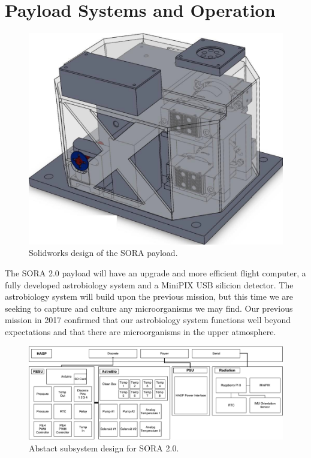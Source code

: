 \section{Payload Systems and Operation}
\label{sec:Hardware}

\begin{figure}[!ht]
\begin{center}
\includegraphics[width=.75\textwidth]{./Figures/payload_1.jpg}
\caption{Solidworks design of the SORA payload.}
\label{fig:payload} 
\end{center}
\end{figure}

The SORA 2.0 payload will have an upgrade and more efficient flight computer, a fully developed astrobiology system and a MiniPIX USB silicion detector.  The astrobiology system will build upon the previous mission, but this time we are seeking to capture and culture any microorganisms we may find.  Our previous mission in 2017 confirmed that our astrobiology system functions well beyond expectations and that there are microorganisms in the upper atmosphere.

\begin{figure}[!ht]
\begin{center}
\includegraphics[width=\textwidth]{./Figures/RESU_2018.pdf}
\caption{Abstact subsystem design for SORA 2.0.}
\label{fig:payload} 
\end{center}
\end{figure}
